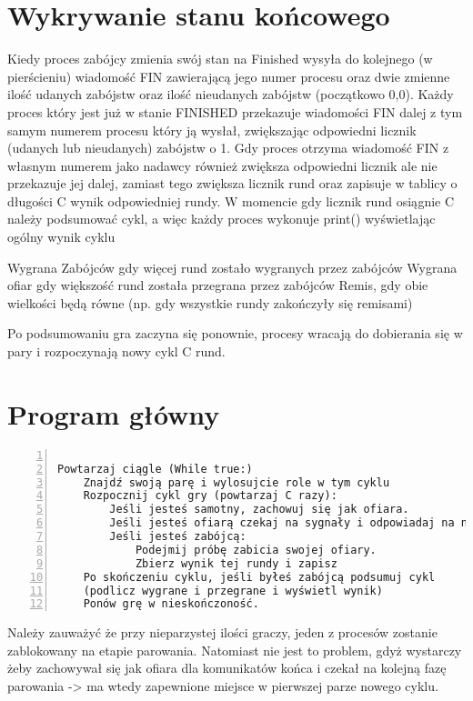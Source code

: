 \documentclass[11pt]{article}
\begin{document}
\section{Wykrywanie stanu końcowego}

Kiedy proces zabójcy zmienia swój stan na Finished wysyła do kolejnego (w pierścieniu) wiadomość FIN zawierającą jego numer procesu oraz dwie zmienne ilość udanych zabójstw oraz ilość nieudanych zabójstw (początkowo 0,0). Każdy proces który jest już w stanie FINISHED przekazuje wiadomości FIN dalej z tym samym numerem procesu który ją wysłał, zwiększając odpowiedni licznik (udanych lub nieudanych) zabójstw o 1.
Gdy proces otrzyma wiadomość FIN z własnym numerem jako nadawcy również zwiększa odpowiedni licznik ale nie przekazuje jej dalej, zamiast tego zwiększa licznik rund oraz zapisuje w tablicy o długości C wynik odpowiedniej rundy. 
W momencie gdy licznik rund osiągnie C należy podsumować cykl, a więc każdy proces wykonuje print() wyświetlając ogólny wynik cyklu 

Wygrana Zabójców gdy więcej rund zostało wygranych przez zabójców
Wygrana ofiar gdy większość rund została przegrana przez zabójców
Remis, gdy obie wielkości będą równe (np. gdy wszystkie rundy zakończyły się remisami)

Po podsumowaniu gra zaczyna się ponownie, procesy wracają do dobierania się w pary i rozpoczynają nowy cykl C rund.


\section{Program główny}

\begin{Verbatim}[numbers=left,xleftmargin=5mm]

Powtarzaj ciągle (While true:)
    Znajdź swoją parę i wylosujcie role w tym cyklu
    Rozpocznij cykl gry (powtarzaj C razy):
        Jeśli jesteś samotny, zachowuj się jak ofiara.
        Jeśli jesteś ofiarą czekaj na sygnały i odpowiadaj na nie odpowiednio
        Jeśli jesteś zabójcą:
            Podejmij próbę zabicia swojej ofiary.
            Zbierz wynik tej rundy i zapisz
    Po skończeniu cyklu, jeśli byłeś zabójcą podsumuj cykl
    (podlicz wygrane i przegrane i wyświetl wynik)
    Ponów grę w nieskończoność.
\end{Verbatim}

Należy zauważyć że przy nieparzystej ilości graczy, jeden z procesów zostanie zablokowany na etapie parowania. Natomiast nie jest to problem, gdyż wystarczy żeby zachowywał się jak ofiara dla komunikatów końca i czekał na kolejną fazę parowania -> ma wtedy zapewnione miejsce w pierwszej parze nowego cyklu.
\end{document}
